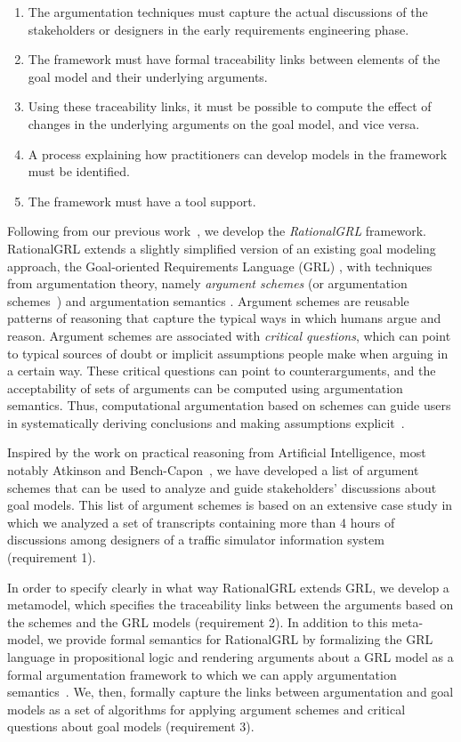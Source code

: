 \begin{enumerate}
\item 
The argumentation techniques must capture the actual discussions of the stakeholders or designers in the early requirements engineering phase.
\item 
The framework must have formal traceability links between elements of the goal model and their underlying arguments.
\item 
Using these traceability links, it must be possible to compute the effect of changes in the underlying arguments on the goal model, and vice versa.
\item 
A process explaining how practitioners can develop models in the framework must be identified.
\item 
The framework must have a tool support.
\end{enumerate}

Following from our previous work~\cite{vanzee-etal:renext2015,vanZee-etal:er2016}, we develop the \emph{RationalGRL} framework. RationalGRL extends a slightly simplified version of an existing goal modeling approach, the Goal-oriented Requirements Language (GRL) \cite{Amyot:2010:EGM:1841349.1841356}, with techniques from argumentation theory, namely \emph{argument schemes} (or argumentation schemes~\cite{walton-etal2008}) and argumentation semantics \cite{Dung1995}. Argument schemes are reusable patterns of reasoning that capture the typical ways in which humans argue and reason. Argument schemes are associated with \emph{critical questions}, which can point to typical sources of doubt or implicit assumptions people make when arguing in a certain way. These critical questions can point to counterarguments, and the acceptability of sets of arguments can be computed using argumentation semantics. Thus, computational argumentation based on schemes can guide users in systematically deriving conclusions and making assumptions explicit~\cite{bexEtal2003,murukannaiah2015}. 

Inspired by the work on practical reasoning from Artificial Intelligence, most notably Atkinson and Bench-Capon~\cite{atkinson2007}, we have developed a list of argument schemes that can be used to analyze and guide stakeholders' discussions about goal models. This list of argument schemes is based on an extensive case study in which we analyzed a set of transcripts containing more than 4 hours of discussions among designers of a traffic simulator information system (requirement 1). 

In order to specify clearly in what way RationalGRL extends GRL, we develop a metamodel, which specifies the traceability links between the arguments based on the schemes and the GRL models (requirement 2). In addition to this meta-model, we provide formal semantics for RationalGRL by formalizing the GRL language in propositional logic and rendering arguments about a GRL model as a formal argumentation framework to which we can apply argumentation semantics~\cite{Dung1995}. We, then, formally capture the links between argumentation and goal models as a set of algorithms for applying argument schemes and critical questions about goal models (requirement 3). 

